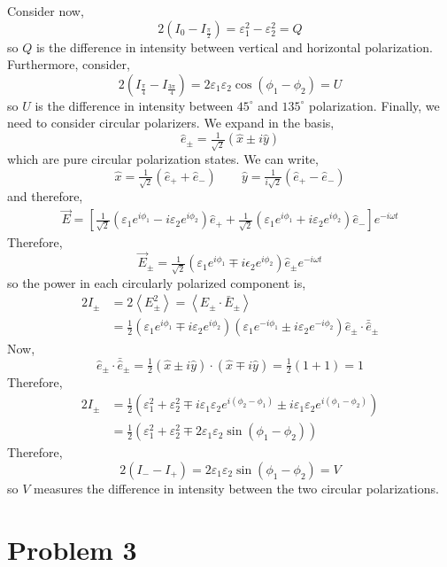 \documentclass[12pt]{article}
\begin{document}
Consider now,
\[ 2(I_0 - I_{\frac{\pi}{2}}) = \varepsilon_1^2 - \varepsilon_2^2 = Q \]
so $Q$ is the difference in intensity between vertical and horizontal polarization. Furthermore, consider,
\[ 2 (I_{\frac{\pi}{4}} - I_{\frac{3 \pi}{4}}) = 2 \varepsilon_1 \varepsilon_2 \cos{(\phi_1 - \phi_2)} = U \]
so $U$ is the difference in intensity between $45^\circ$ and $135^\circ$ polarization.
Finally, we need to consider circular polarizers. We expand in the basis,
\[ \hat{e}_\pm = \tfrac{1}{\sqrt{2}} (\hat{x} \pm i \hat{y}) \]
which are pure circular polarization states. We can write,
\[ \hat{x} = \tfrac{1}{\sqrt{2}} (\hat{e}_+ + \hat{e}_-) \quad \quad \hat{y} = \tfrac{1}{i \sqrt{2}} (\hat{e}_+ - \hat{e}_-) \]
and therefore,
\begin{align*}
\vec{E} = \left[ \tfrac{1}{\sqrt{2}} (\varepsilon_1 e^{i \phi_1} - i \varepsilon_2 e^{i \phi_2}) \hat{e}_+ + \tfrac{1}{\sqrt{2}} (\varepsilon_1 e^{i \phi_1} + i \varepsilon_2 e^{i \phi_2}) \hat{e}_-  \right] e^{-i \omega t}
\end{align*}
Therefore,
\[ \vec{E}_{\pm} = \tfrac{1}{\sqrt{2}} (\varepsilon_1 e^{i \phi_1} \mp i \epsilon_2 e^{i \phi_2} ) \hat{e}_{\pm} e^{- i \omega t} \]
so the power in each circularly polarized component is,
\begin{align*}
2 I_{\pm} & = 2 \left< E_{\pm}^2 \right> = \left< E_{\pm} \cdot \bar{E}_{\pm} \right>
\\
& = \tfrac{1}{2} (\varepsilon_1 e^{i \phi_1} \mp i \varepsilon_2 e^{i \phi_2}) (\varepsilon_1 e^{-i \phi_1} \pm i \varepsilon_2 e^{-i \phi_2}) \hat{e}_{\pm} \cdot \bar{\hat{e}}_{\pm}
\end{align*}
Now,
\[ \hat{e}_{\pm} \cdot \bar{\hat{e}}_{\pm} = \tfrac{1}{2} (\hat{x} \pm i \hat{y}) \cdot (\hat{x} \mp i \hat{y}) = \tfrac{1}{2} (1 + 1) = 1 \]
Therefore,
\begin{align*}
2 I_{\pm} & = \tfrac{1}{2} \left( \varepsilon_1^2 + \varepsilon_2^2 \mp i \varepsilon_1 \varepsilon_2 e^{i (\phi_2 - \phi_1)} \pm i \varepsilon_1 \varepsilon_2 e^{i (\phi_1 - \phi_2)} \right)
\\
& = \tfrac{1}{2} \left( \varepsilon_1^2 + \varepsilon_2^2  \mp 2 \varepsilon_1 \varepsilon_2 \sin{(\phi_1 - \phi_2)}  \right)
\end{align*}
Therefore,
\[ 2 (I_{-} - I_{+}) = 2 \varepsilon_1 \varepsilon_2 \sin{(\phi_1 - \phi_2)} = V \]
so $V$ measures the difference in intensity between the two circular polarizations. 

\section{Problem 3}
\end{document}
